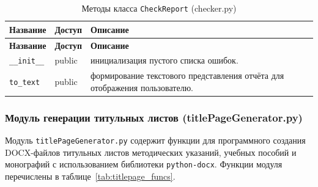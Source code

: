 \begin{xltabular}{\textwidth}{|p{7cm}|p{1.8cm}|X|}
	\caption{Методы класса \texttt{CheckReport} (checker.py)\label{tab:checkreport_class}}\\
	\hline
	\textbf{Название} & \textbf{Доступ} & \textbf{Описание} \\
	\hline
	\endfirsthead
	
	\hline
	\textbf{Название} & \textbf{Доступ} & \textbf{Описание} \\
	\hline
	\endhead
	
	\hline
	\endfoot
	
	\texttt{\_\_init\_\_} & public & инициализация пустого списка ошибок. \\ \hline
	\texttt{to\_text} & public & формирование текстового представления отчёта для отображения пользователю. \\ \hline
\end{xltabular}

\subsubsection{Модуль генерации титульных листов (titlePageGenerator.py)}

Модуль \texttt{titlePageGenerator.py} содержит функции для программного создания DOCX-файлов титульных листов методических указаний, учебных пособий и монографий с использованием библиотеки \texttt{python-docx}. Функции модуля перечислены в таблице~\ref{tab:titlepage_funcs}.


